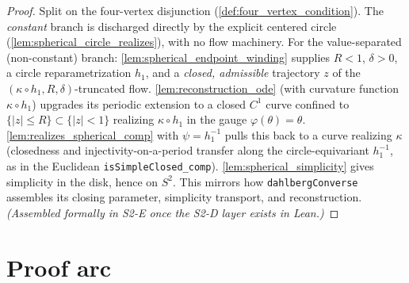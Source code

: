\begin{proof}
        \leanok
  Split on the four-vertex disjunction (\cref{def:four_vertex_condition}). The
  \emph{constant} branch is discharged directly by the explicit centered circle
  (\cref{lem:spherical_circle_realizes}), with no flow machinery. For the value-separated
  (non-constant) branch: \cref{lem:spherical_endpoint_winding} supplies $R<1$,
  $\delta>0$, a circle reparametrization $h_1$, and a \emph{closed, admissible}
  trajectory $z$ of the $(\kappa\circ h_1,R,\delta)$-truncated flow.
  \cref{lem:reconstruction_ode} (with curvature function $\kappa\circ h_1$) upgrades its
  periodic extension to a closed $C^1$ curve confined to $\{|z|\le R\}\subset\{|z|<1\}$
  realizing $\kappa\circ h_1$ in the gauge $\varphi(\theta)=\theta$.
  \cref{lem:realizes_spherical_comp} with $\psi=h_1^{-1}$ pulls this back to a curve
  realizing $\kappa$ (closedness and injectivity-on-a-period transfer along the
  circle-equivariant $h_1^{-1}$, as in the Euclidean
  \texttt{isSimpleClosed\_comp}). \cref{lem:spherical_simplicity} gives simplicity in
  the disk, hence on $S^2$. This mirrors how \texttt{dahlbergConverse} assembles its
  closing parameter, simplicity transport, and reconstruction. \emph{(Assembled formally
  in S2-E once the S2-D layer exists in Lean.)}
\end{proof}

\section{Proof arc}
\label{sec:sphere_arc}

